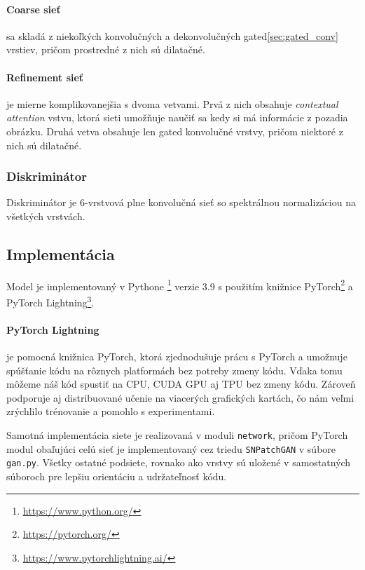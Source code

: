 \documentclass [11pt, a4paper]{article}
\begin{document}
				\paragraph{Coarse sieť} sa skladá z niekoľkých konvolučných a dekonvolučných gated\ref{sec:gated_conv} vrstiev, pričom prostredné z nich sú dilatačné.
				\paragraph{Refinement sieť} je mierne komplikovanejšia s dvoma vetvami. Prvá z nich obsahuje \textit{contextual attention} \cite{yu2018generative} vstvu, ktorá sieti umožňuje naučiť sa kedy si má  informácie z pozadia obrázku. Druhá vetva obsahuje len gated konvolučné vrstvy, pričom niektoré z nich sú dilatačné.
				
			\subsubsection{Diskriminátor}\label{sec:discriminator}
				Diskriminátor je 6-vrstvová plne konvolučná sieť so spektrálnou normalizáciou na všetkých vrstvách. 
				
		\subsection{Implementácia}
			Model je implementovaný v Pythone \footnote{\url{https://www.python.org/}} verzie 3.9 s použitím knižnice PyTorch\footnote{\url{https://pytorch.org/}} a PyTorch Lightning\footnote{\url{https://www.pytorchlightning.ai/}}.
			
			\paragraph{PyTorch Lightning} je pomocná knižnica PyTorch, ktorá zjednodušuje prácu s PyTorch a umožnuje spúšťanie kódu na rôznych platformách bez potreby zmeny kódu. Vďaka tomu môžeme náš kód spustiť na CPU, CUDA GPU aj TPU bez zmeny kódu. Zároveň podporuje aj distribuované učenie na viacerých grafických kartách, čo nám veľmi zrýchlilo trénovanie a pomohlo s experimentami.
			
			Samotná implementácia siete je realizovaná v moduli \texttt{network}, pričom PyTorch modul obaľujúci celú sieť je implementovaný cez triedu \texttt{SNPatchGAN} v súbore \texttt{gan.py}. Všetky ostatné podsiete, rovnako ako vrstvy sú uložené v samostatných súboroch pre lepšiu orientáciu a udržateľnosť kódu.
				
\end{document}
